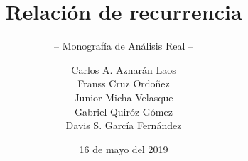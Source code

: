 \documentclass[graybox,envcountchap,sectrefs]{svmono}
\date{16 de mayo del 2019}
\begin{document}
\author{Carlos A. Aznarán Laos\\
Franss Cruz Ordoñez\\
Junior Micha Velasque\\
Gabriel Quiróz Gómez\\
Davis S. García Fernández}
\title{Relación de recurrencia}
\subtitle{-- Monografía de Análisis Real --}
\maketitle

\frontmatter%





\tableofcontents



\mainmatter%

%




%



%
%


\backmatter%
%
%

\printindex

\end{document}
